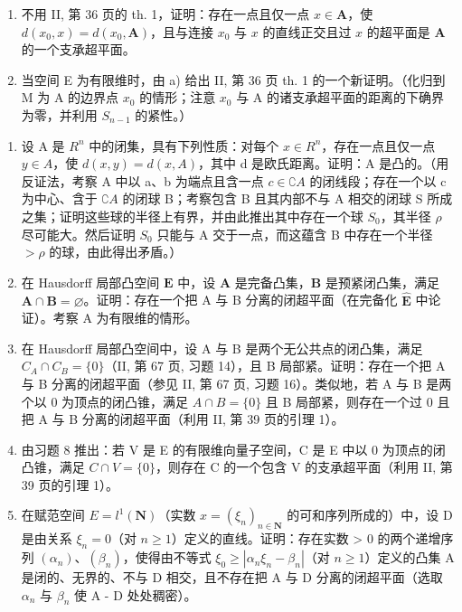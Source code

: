 \begin{enumerate}
\def\labelenumi{\alph{enumi})}
\item
  不用 II, 第 36 页的 th. 1，证明：存在一点且仅一点 \(x \in \mathbf{A}\)，使 \(d(x_0, x) = d(x_0, \mathbf{A})\)，且与连接 \(x_0\) 与 \(x\) 的直线正交且过 \(x\) 的超平面是 \(\mathbf{A}\) 的一个支承超平面。
\item
  当空间 E 为有限维时，由 a) 给出 II, 第 36 页 th. 1 的一个新证明。（化归到 M 为 A 的边界点 \(x_{0}\) 的情形；注意 \(x_{0}\) 与 A 的诸支承超平面的距离的下确界为零，并利用 \(S_{n-1}\) 的紧性。）
\end{enumerate}

\begin{enumerate}
\def\labelenumi{\arabic{enumi})}
\setcounter{enumi}{5}
\item
  设 A 是 \(R^{n}\) 中的闭集，具有下列性质：对每个 \(x \in R^{n}\)，存在一点且仅一点 \(y \in A\)，使 \(d(x, y) = d(x, A)\)，其中 d 是欧氏距离。证明：A 是凸的。（用反证法，考察 A 中以 a、b 为端点且含一点 \(c \in \complement A\) 的闭线段；存在一个以 c 为中心、含于 \(\complement A\) 的闭球 B；考察包含 B 且其内部不与 A 相交的闭球 S 所成之集；证明这些球的半径上有界，并由此推出其中存在一个球 \(S_{0}\)，其半径 \(\rho\) 尽可能大。然后证明 \(S_{0}\) 只能与 A 交于一点，而这蕴含 B 中存在一个半径 \(> \rho\) 的球，由此得出矛盾。）
\item
  在 Hausdorff 局部凸空间 \(\mathbf{E}\) 中，设 \(\mathbf{A}\) 是完备凸集，\(\mathbf{B}\) 是预紧闭凸集，满足 \(\mathbf{A} \cap \mathbf{B} = \varnothing\)。证明：存在一个把 A 与 B 分离的闭超平面（在完备化 \(\hat{\mathbf{E}}\) 中论证）。考察 A 为有限维的情形。
\item
  在 Hausdorff 局部凸空间中，设 A 与 B 是两个无公共点的闭凸集，满足 \(C_{A} \cap C_{B} = \{0\}\)（II, 第 67 页, 习题 14），且 B 局部紧。证明：存在一个把 A 与 B 分离的闭超平面（参见 II, 第 67 页, 习题 16）。类似地，若 A 与 B 是两个以 0 为顶点的闭凸锥，满足 \(A \cap B = \{0\}\) 且 B 局部紧，则存在一个过 0 且把 A 与 B 分离的闭超平面（利用 II, 第 39 页的引理 1）。
\item
  由习题 8 推出：若 V 是 E 的有限维向量子空间，C 是 E 中以 0 为顶点的闭凸锥，满足 \(C \cap V = \{0\}\)，则存在 C 的一个包含 V 的支承超平面（利用 II, 第 39 页的引理 1）。
\item
  在赋范空间 \(E = l^{1}(\mathbf{N})\)（实数 \(x = (\xi_{n})_{n \in \mathbf{N}}\) 的可和序列所成的）中，设 D 是由关系 \(\xi_{n} = 0\)（对 \(n \geqslant 1\)）定义的直线。证明：存在实数 > 0 的两个递增序列 \((\alpha_{n})\)、\((\beta_{n})\)，使得由不等式 \(\xi_{0} \geqslant |\alpha_{n}\xi_{n} - \beta_{n}|\)（对 \(n \geqslant 1\)）定义的凸集 A 是闭的、无界的、不与 D 相交，且不存在把 A 与 D 分离的闭超平面（选取 \(\alpha_{n}\) 与 \(\beta_{n}\) 使 A - D 处处稠密）。
\end{enumerate}

